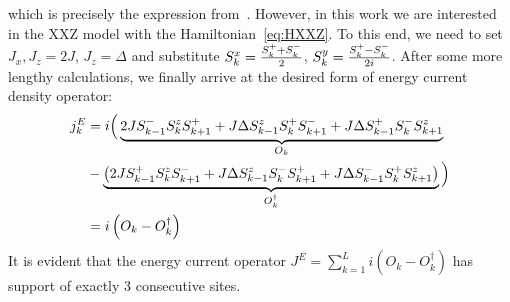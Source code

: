 which is precisely the expression from~\textcite{Zotos1997}. 
However, in this work we are interested in the XXZ model with the Hamiltonian~\eqref{eq:HXXZ}. To this end,
we need to set \(J_x, J_z = 2J\), \(J_z = \Delta \) and substitute \(S^{x}_k = \frac{S^{+}_k + S^{-}_k}{2}\), \(S^{y}_k = \frac{S^{+}_k-S^{-}_k}{2i}\).
After some more lengthy calculations, we finally arrive at the desired form of energy current density operator:
\begin{align}
    j_k^E &= i \Big( \underbrace{2J S^{-}_{k-1}S^{z}_k S^{+}_{k+1} + J \Delta S^{z}_{k-1}S^{+}_k S^{-}_{k+1} + J\Delta S^{+}_{k-1}S^{-}_kS^{z}_{k+1}}_{O_k} \nonumber \\
    &- \underbrace{\left(2J S^{+}_{k-1}S^{z}_k S^{-}_{k+1} + J\Delta S^{z}_{k-1}S^{-}_k S^{+}_{k+1} + J\Delta S^{-}_{k-1}S^{+}_{k} S^{z}_{k+1} \right)}_{O_k^{\dagger}}\Big) \nonumber \\
    &= i\left(O_k - O_k^{\dagger}\right)
    \label{eq:final energy current density}
\end{align}
It is evident that the energy current operator \(J^E = \sum_{k=1}^L i \left(O_k - O_k^{\dagger}\right) \) has support of exactly \(3\) consecutive sites.

